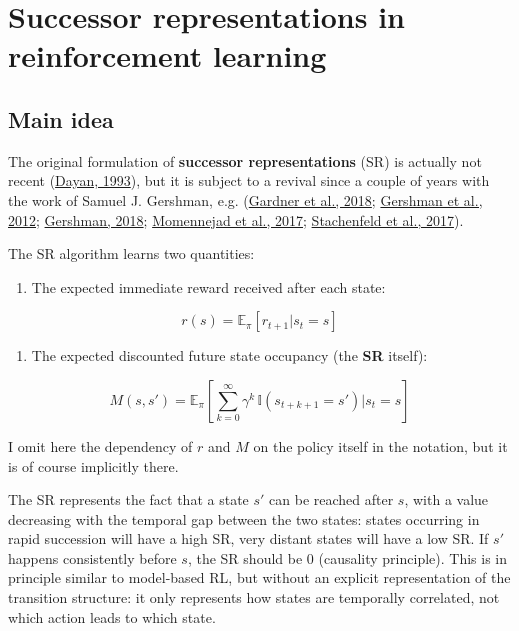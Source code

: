 \documentclass[
  11pt,
]{article}
\providecommand{\tightlist}{%
  \setlength{\itemsep}{0pt}\setlength{\parskip}{0pt}}
\begin{document}
\hypertarget{successor-representations-in-reinforcement-learning}{%
\section{Successor representations in reinforcement
learning}\label{successor-representations-in-reinforcement-learning}}

\hypertarget{main-idea}{%
\subsection{Main idea}\label{main-idea}}

The original formulation of \textbf{successor representations} (SR) is
actually not recent (\protect\hyperlink{ref-Dayan1993}{Dayan, 1993}),
but it is subject to a revival since a couple of years with the work of
Samuel J. Gershman, e.g. (\protect\hyperlink{ref-Gardner2018}{Gardner et
al., 2018}; \protect\hyperlink{ref-Gershman2012}{Gershman et al., 2012};
\protect\hyperlink{ref-Gershman2018}{Gershman, 2018};
\protect\hyperlink{ref-Momennejad2017a}{Momennejad et al., 2017};
\protect\hyperlink{ref-Stachenfeld2017}{Stachenfeld et al., 2017}).

The SR algorithm learns two quantities:

\begin{enumerate}
\def\labelenumi{\arabic{enumi}.}
\tightlist
\item
  The expected immediate reward received after each state:
\end{enumerate}

\[
    r(s) = \mathbb{E}_{\pi} [r_{t+1} | s_t = s]
\]

\begin{enumerate}
\def\labelenumi{\arabic{enumi}.}
\setcounter{enumi}{1}
\tightlist
\item
  The expected discounted future state occupancy (the \textbf{SR}
  itself):
\end{enumerate}

\[
    M(s, s') = \mathbb{E}_{\pi} [\sum_{k=0}^\infty \gamma^k \, \mathbb{I}(s_{t+k+1} = s') | s_t = s]
\]

I omit here the dependency of \(r\) and \(M\) on the policy itself in
the notation, but it is of course implicitly there.

The SR represents the fact that a state \(s'\) can be reached after
\(s\), with a value decreasing with the temporal gap between the two
states: states occurring in rapid succession will have a high SR, very
distant states will have a low SR. If \(s'\) happens consistently before
\(s\), the SR should be 0 (causality principle). This is in principle
similar to model-based RL, but without an explicit representation of the
transition structure: it only represents how states are temporally
correlated, not which action leads to which state.
\end{document}
